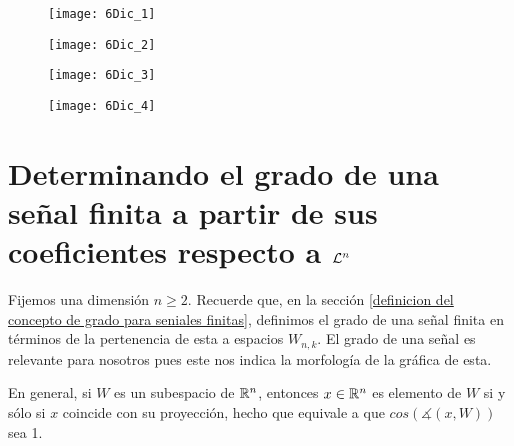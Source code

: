 \begin{ejemplo}
\begin{figure}[H]
	\centering
	\texttt{[image: 6Dic\_1]}
\end{figure}

\begin{figure}[H]
	\centering
	\texttt{[image: 6Dic\_2]}
\end{figure}

\begin{figure}[H]
	\centering
	\texttt{[image: 6Dic\_3]}
\end{figure}

\begin{figure}[H]
	\centering
	\texttt{[image: 6Dic\_4]}
\end{figure}


\final
\end{ejemplo}




\section{Determinando el grado de una señal finita a partir de sus coeficientes respecto a $\mathcal{L}^{n}$}

Fijemos una dimensión $n \geq 2$. 
Recuerde que, en la sección 
\ref{definicion del concepto de grado para seniales finitas},
definimos el grado de una señal finita en términos de la pertenencia
de esta a espacios $W_{n,k}$. El grado de una señal es relevante
para nosotros pues este nos indica la morfología de la gráfica de
esta.

En general, si $W$ es un subespacio de $\mathbb{R}^{n}$, entonces
$x \in \mathbb{R}^{n}$ es elemento de $W$ si y sólo si 
$x$ coincide con su proyección, hecho que equivale a que
$cos(\measuredangle(x, W))$ sea 1.

